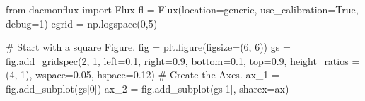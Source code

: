 \documentclass[
  letterpaper,
  DIV=11,
  numbers=noendperiod]{scrreprt}
\newenvironment{Shaded}{\begin{snugshade}}{\end{snugshade}}
\newcommand{\CommentTok}[1]{\textcolor[rgb]{0.37,0.37,0.37}{#1}}
\newcommand{\DecValTok}[1]{\textcolor[rgb]{0.68,0.00,0.00}{#1}}
\newcommand{\FloatTok}[1]{\textcolor[rgb]{0.68,0.00,0.00}{#1}}
\newcommand{\ImportTok}[1]{\textcolor[rgb]{0.00,0.46,0.62}{#1}}
\newcommand{\NormalTok}[1]{\textcolor[rgb]{0.00,0.23,0.31}{#1}}
\newcommand{\OperatorTok}[1]{\textcolor[rgb]{0.37,0.37,0.37}{#1}}
\newcommand{\StringTok}[1]{\textcolor[rgb]{0.13,0.47,0.30}{#1}}
\newcommand{\VariableTok}[1]{\textcolor[rgb]{0.07,0.07,0.07}{#1}}
\begin{document}
\begin{Shaded}
\begin{Highlighting}[]
\ImportTok{from}\NormalTok{ daemonflux }\ImportTok{import}\NormalTok{ Flux}
\NormalTok{fl }\OperatorTok{=}\NormalTok{ Flux(location}\OperatorTok{=}\StringTok{\textquotesingle{}generic\textquotesingle{}}\NormalTok{, use\_calibration}\OperatorTok{=}\VariableTok{True}\NormalTok{, debug}\OperatorTok{=}\DecValTok{1}\NormalTok{)}
\NormalTok{egrid }\OperatorTok{=}\NormalTok{ np.logspace(}\DecValTok{0}\NormalTok{,}\DecValTok{5}\NormalTok{)}

\CommentTok{\# Start with a square Figure.}
\NormalTok{fig }\OperatorTok{=}\NormalTok{ plt.figure(figsize}\OperatorTok{=}\NormalTok{(}\DecValTok{6}\NormalTok{, }\DecValTok{6}\NormalTok{))}
\NormalTok{gs }\OperatorTok{=}\NormalTok{ fig.add\_gridspec(}\DecValTok{2}\NormalTok{, }\DecValTok{1}\NormalTok{, }
\NormalTok{                      left}\OperatorTok{=}\FloatTok{0.1}\NormalTok{, right}\OperatorTok{=}\FloatTok{0.9}\NormalTok{, bottom}\OperatorTok{=}\FloatTok{0.1}\NormalTok{, top}\OperatorTok{=}\FloatTok{0.9}\NormalTok{,}
\NormalTok{                      height\_ratios }\OperatorTok{=}\NormalTok{ (}\DecValTok{4}\NormalTok{, }\DecValTok{1}\NormalTok{), wspace}\OperatorTok{=}\FloatTok{0.05}\NormalTok{, hspace}\OperatorTok{=}\FloatTok{0.12}\NormalTok{)}
\CommentTok{\# Create the Axes.}
\NormalTok{ax\_1 }\OperatorTok{=}\NormalTok{ fig.add\_subplot(gs[}\DecValTok{0}\NormalTok{])}
\NormalTok{ax\_2 }\OperatorTok{=}\NormalTok{ fig.add\_subplot(gs[}\DecValTok{1}\NormalTok{], sharex}\OperatorTok{=}\NormalTok{ax)}


\end{Highlighting}
\end{Shaded}
\end{document}
